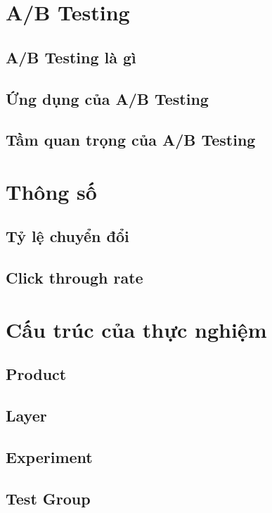 \section{A/B Testing}

\subsection{A/B Testing là gì}

\subsection{Ứng dụng của A/B Testing}

\subsection{Tầm quan trọng của A/B Testing}

\section{Thông số}

\subsection{Tỷ lệ chuyển đổi}

\subsection{Click through rate}

\section{Cấu trúc của thực nghiệm}

\subsection{Product}

\subsection{Layer}

\subsection{Experiment}

\subsection{Test Group}

